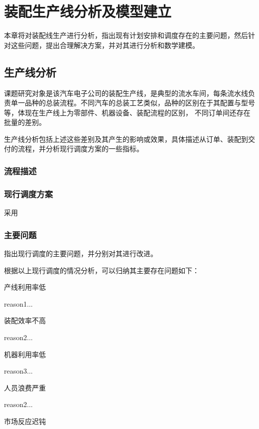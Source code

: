 \chapter{装配生产线分析及模型建立}
本章将对装配线生产进行分析，指出现有计划安排和调度存在的主要问题，然后针对这些问题，提出合理解决方案，并对其进行分析和数学建模。
\section{生产线分析}
课题研究对象是该汽车电子公司的装配生产线，是典型的流水车间，每条流水线负责单一品种的总装流程。不同汽车的总装工艺类似，品种的区别在于其配置与型号等，体现在生产线上为零部件、机器设备、装配流程的区别，
不同订单间还存在批量的差别。

生产线分析包括上述这些差别及其产生的影响或效果，具体描述从订单、装配到交付的流程，并分析现行调度方案的一些指标。

\subsection{流程描述}

\subsection{现行调度方案}
采用

\subsection{主要问题}
指出现行调度的主要问题，并分别对其进行改进。

根据以上现行调度的情况分析，可以归纳其主要存在问题如下：
\renewcommand{\labelenumi}{(\theenumi)}
\begin{asparaenum}
\item 产线利用率低

reason1...
\item 装配效率不高

reason2...
\item 机器利用率低

reason3...
\item 人员浪费严重

reason2...
\item 市场反应迟钝
\end{asparaenum}

